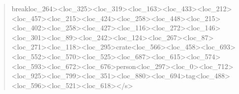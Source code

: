 \documentclass[10pt,a4paper]{article}
\begin{document}
\begin{quote}
break{}loc\_264>\allowbreak{}<loc\_325>\allowbreak{}<loc\_319>\allowbreak{}<loc\_1\allowbreak{}63>\allowbreak{}<loc\_433>\allowbreak{}<loc\_212>\allowbreak{}<loc\_457>\allowbreak{}<l\allowbreak{}oc\_215>\allowbreak{}<loc\_424>\allowbreak{}<loc\_258>\allowbreak{}<loc\_44\allowbreak{}8>\allowbreak{}<loc\_215>\allowbreak{}<loc\_402>\allowbreak{}<loc\_258>\allowbreak{}<lo\allowbreak{}c\_427>\allowbreak{}<loc\_116>\allowbreak{}<loc\_272>\allowbreak{}<loc\_146\allowbreak{}>\allowbreak{}<loc\_301>\allowbreak{}<loc\_89>\allowbreak{}<loc\_242>\allowbreak{}<loc\_\allowbreak{}124>\allowbreak{}<loc\_267>\allowbreak{}<loc\_87>\allowbreak{}<loc\_271>\allowbreak{}<l\allowbreak{}oc\_118>\allowbreak{}<loc\_295>\allowbreak{}crate<loc\_566>\allowbreak{}<l\allowbreak{}oc\_458>\allowbreak{}<loc\_693>\allowbreak{}<loc\_552>\allowbreak{}<loc\_57\allowbreak{}0>\allowbreak{}<loc\_525>\allowbreak{}<loc\_687>\allowbreak{}<loc\_615>\allowbreak{}<lo\allowbreak{}c\_574>\allowbreak{}<loc\_593>\allowbreak{}<loc\_672>\allowbreak{}<loc\_676\allowbreak{}>\allowbreak{}person<loc\_297>\allowbreak{}<loc\_0>\allowbreak{}<loc\_712>\allowbreak{}\allowbreak{}<loc\_925>\allowbreak{}<loc\_799>\allowbreak{}<loc\_351>\allowbreak{}<loc\_\allowbreak{}880>\allowbreak{}<loc\_694>\allowbreak{}tag<loc\_488>\allowbreak{}<loc\_59\allowbreak{}6>\allowbreak{}<loc\_521>\allowbreak{}<loc\_618>\allowbreak{}</s>\allowbreak{}
\end{quote}
\end{document}
